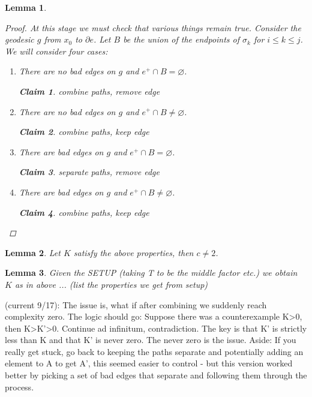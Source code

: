 \documentclass{article}
\theoremstyle{mystyle}
\newtheorem{lem}{Lemma}[section]
\newtheorem*{claim*}{Claim}
\theoremstyle{remark}
\begin{document}
\begin{lem}
\begin{proof}
		At this stage we must check that various things remain true. Consider the geodesic \(g\) from \(x_{ 0}\) to \(\partial e\). Let \(B\) be the union of the endpoints of \(\sigma_{k}\) for \(i\leq k\leq j\). We will consider four cases:
		\begin{enumerate}
			\item There are no bad edges on \(g\) and \(e^{+} \cap B= \varnothing \). 
				\begin{claim*}
					combine paths, remove edge
				\end{claim*}
			\item There are no bad edges on \(g\) and \(e^{+} \cap B\neq \varnothing \). 
				\begin{claim*}
					combine paths, keep edge
				\end{claim*}
			\item There are bad edges on \(g\) and \(e^{+} \cap B= \varnothing \). 
				\begin{claim*}
					separate paths, remove edge	
				\end{claim*}
			\item There are bad edges on \(g\) and \(e^{+} \cap B\neq \varnothing \). 
				\begin{claim*}
					combine paths, keep edge
				\end{claim*}
		\end{enumerate}
	\end{proof}
\end{lem}

\begin{lem}
	Let \(K\) satisfy the above properties, then \(c \neq 2\).
\end{lem}

\begin{lem}
	Given the SETUP (taking T to be the middle factor etc.) we obtain \(K\) as in above ... (list the properties we get from setup)
\end{lem}

(current 9/17): The issue is, what if after combining we suddenly reach complexity zero. The logic should go: Suppose there was a counterexample K>0, then K>K'>0. Continue ad infinitum, contradiction. The key is that K' is strictly less than K and that K' is never zero. The never zero is the issue. Aside: If you really get stuck, go back to keeping the paths separate and potentially adding an element to A to get A', this seemed easier to control - but this version worked better by picking a set of bad edges that separate and following them through the process.
\end{document}
